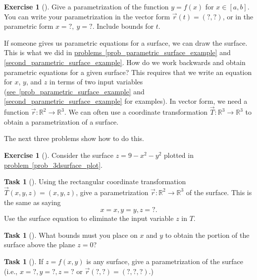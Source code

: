 \documentclass[10pt,]{book}
\theoremstyle{plain}
\theoremstyle{definition}
\theoremstyle{definition}
\theoremstyle{definition}
\theoremstyle{definition}
\newtheorem{exploration}[project]{Exercise}
\newtheorem{task}[project]{Task}
\theoremstyle{definition}
\numberwithin{equation}{section}
\begin{document}
\begin{exploration}[]\label{exploration-124}
Give a parametrization of the function \(y=f(x)\) for \(x\in[a,b]\). You can write your parametrization in the vector form \(\vec r(t)=(?,?)\), or in the parametric form \(x=?,\ y=?\). Include bounds for \(t\).%
\end{exploration}
If someone gives us parametric equations for a surface, we can draw the surface. This is what we did in \hyperref[prob_parametric_surface_example]{problems~\ref{prob_parametric_surface_example}} and \hyperref[second_parametric_surface_example]{\ref{second_parametric_surface_example}}. How do we work backwards and obtain parametric equations for a given surface? This requires that we write an equation for \(x\), \(y\), and \(z\) in terms of two input variables (\hyperref[prob_parametric_surface_example]{see~\ref{prob_parametric_surface_example}} and \hyperref[second_parametric_surface_example]{\ref{second_parametric_surface_example}} for examples). In vector form, we need a function \(\vec r\colon \mathbb{R}^2\to\mathbb{R}^3\). We can often use a coordinate transformation \(\vec T\colon \mathbb{R}^3\to\mathbb{R}^3\) to obtain a parametrization of a surface.%
\par
The next three problems show how to do this.%
\begin{exploration}[]\label{x3d_parametric_plot}
Consider the surface \(z=9-x^2-y^2\) plotted in \hyperref[prob_3dsurface_plot]{problem~\ref{prob_3dsurface_plot}}.%
\begin{task}[]\label{task-247}
Using the rectangular coordinate transformation \(\vec T(x,y,z)=(x,y,z)\), give a parametrization \(\vec r\colon \mathbb{R}^2\to\mathbb{R}^3\) of the surface. This is the same as saying%
\begin{equation*}
x=x, y=y, z=?.
\end{equation*}
Use the surface equation to eliminate the input variable \(z\) in \(T\).%
%
\end{task}
\begin{task}[]\label{task-248}
What bounds must you place on \(x\) and \(y\) to obtain the portion of the surface above the plane \(z=0\)?%
\end{task}
\begin{task}[]\label{task-249}
If \(z=f(x,y)\) is any surface, give a parametrization of the surface (i.e., \(x=?, y=?, z=?\) or \(\vec r (?,?)=(?,?,?)\).)%
\end{task}
\end{exploration}
\end{document}
